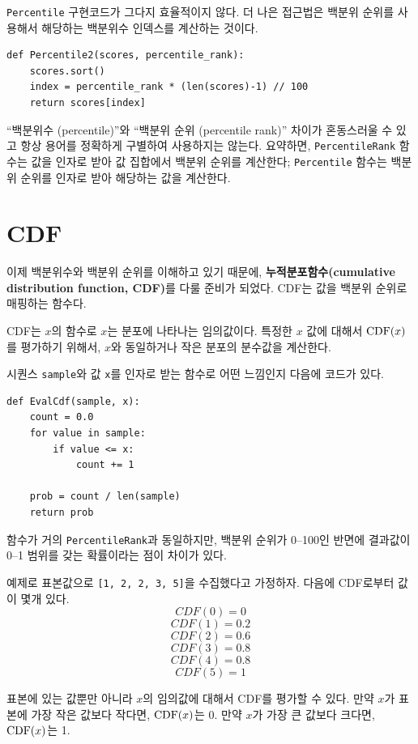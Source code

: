 {\tt Percentile} 구현코드가 그다지 효율적이지 않다.
더 나은 접근법은 백분위 순위를 사용해서 해당하는 백분위수 인덱스를 계산하는 것이다.

\begin{verbatim}
def Percentile2(scores, percentile_rank):
    scores.sort()
    index = percentile_rank * (len(scores)-1) // 100
    return scores[index]
\end{verbatim}

``백분위수 (percentile)''와 ``백분위 순위 (percentile rank)'' 차이가 혼동스러울 수 있고
항상 용어를 정확하게 구별하여 사용하지는 않는다. 요약하면,
{\tt PercentileRank} 함수는 값을 인자로 받아 값 집합에서 백분위 순위를 계산한다;
{\tt Percentile} 함수는 백분위 순위를 인자로 받아 해당하는 값을 계산한다. 

\section{CDF}

이제 백분위수와 백분위 순위를 이해하고 있기 때문에, {\bf 누적분포함수(cumulative distribution function, CDF)}를 다룰 준비가 되었다. CDF는 값을 백분위 순위로 매핑하는 함수다.

CDF는 $x$의 함수로 $x$는 분포에 나타나는 임의값이다.  
특정한 $x$ 값에 대해서 $\mathrm{CDF}(x)$를 평가하기 위해서, 
$x$와 동일하거나 작은 분포의 분수값을 계산한다.

시퀀스 {\tt sample}와 값 {\tt x}를 인자로 받는 함수로 어떤 느낌인지 다음에 코드가 있다.

%
\begin{verbatim}
def EvalCdf(sample, x):
    count = 0.0
    for value in sample:
        if value <= x:
            count += 1

    prob = count / len(sample)
    return prob
\end{verbatim}

함수가 거의 {\tt PercentileRank}과 동일하지만, 백분위 순위가 0--100인 반면에 결과값이 0--1 범위를 갖는 확률이라는 점이 차이가 있다.

예제로 표본값으로 {\tt [1, 2, 2, 3, 5]}을 수집했다고 가정하자. 다음에 CDF로부터 값이 몇개 있다.
%
\[ CDF(0) = 0 \]
%
\[ CDF(1) = 0.2\]
%
\[ CDF(2) = 0.6\]
%
\[ CDF(3) = 0.8\]
%
\[ CDF(4) = 0.8\]
%
\[ CDF(5) = 1\]
%

표본에 있는 값뿐만 아니라 $x$의 임의값에 대해서 CDF를 평가할 수 있다.
만약 $x$가 표본에 가장 작은 값보다 작다면, $\mathrm{CDF}(x)$는 0.
만약 $x$가 가장 큰 값보다 크다면, $\mathrm{CDF}(x)$는 1.

